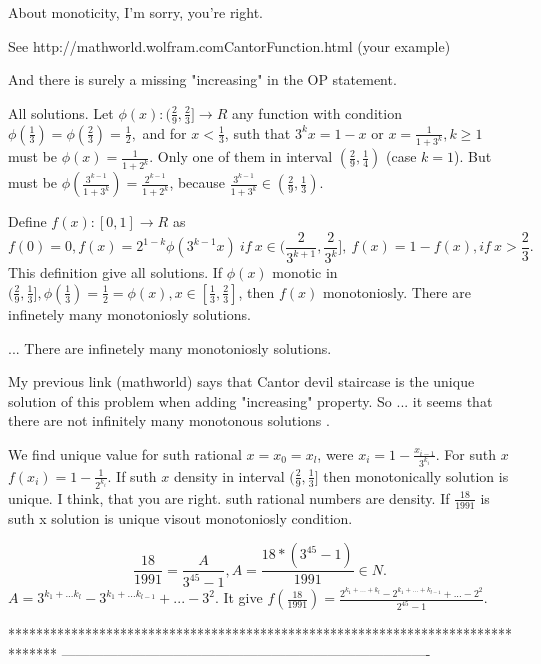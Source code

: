 \begin{solution}
	About monoticity, I'm sorry, you're right. 

See http://mathworld.wolfram.com\/CantorFunction.html (your example)

And there is surely a missing "increasing" in the OP statement.
\end{solution}



\begin{solution}
	All solutions.
Let $\phi(x):(\frac 29,\frac 23]\to R$ any function with condition $\phi(\frac 13)=\phi(\frac 23)=\frac 12,$
and for $x<\frac 13$, suth that $3^kx=1-x$ or $x=\frac{1}{1+3^k}, k\ge 1$ must be $\phi(x)=\frac{1}{1+2^k}$. Only one of them in interval $(\frac 29, \frac 14)$ (case $k=1$). 
But must be $\phi(\frac{3^{k-1}}{1+3^k})=\frac{2^{k-1}}{1+2^k}$, because $\frac{3^{k-1}}{1+3^k}\in(\frac 29, \frac 13).$

Define $f(x):[0,1]\to R$ as \[f(0)=0, f(x)=2^{1-k}\phi(3^{k-1}x) \ if \ x\in (\frac{2}{3^{k+1}},\frac{2}{3^k}], \ f(x)=1-f(x), if \ x>\frac 23.\]
This definition give all solutions.
If $\phi(x)$ monotic in $(\frac 29,\frac 13],  \phi(\frac 13)=\frac 12 =\phi(x), x\in [\frac 13,\frac 23]$, then $f(x)$ monotoniosly.
There are infinetely many monotoniosly solutions.
\end{solution}



\begin{solution}
	\begin{tcolorbox}...
There are infinetely many monotoniosly solutions.\end{tcolorbox}
My previous link (mathworld) says that Cantor devil staircase is the unique solution of this problem when adding "increasing" property. So ... it seems that there are not infinitely many monotonous solutions .
\end{solution}



\begin{solution}
	We find unique value for suth rational $x=x_0=x_l$, were $x_i=1-\frac{x_{i-1}}{3^{k_i}}$.
For suth $x$ $f(x_i)=1-\frac{1}{2^{k_i}}$.
If suth $x$ density in interval $(\frac 29,\frac 13]$ then monotonically solution is unique.
I think, that you are right. suth rational numbers are density.
If $\frac{18}{1991}$ is suth x solution is unique visout monotoniosly condition.

\[\frac{18}{1991}=\frac{A}{3^{45}-1}, A=\frac{18*(3^{45}-1)}{1991}\in N.\]
$A=3^{k_1+...k_l}-3^{k_1+...k_{l-1}}+...-3^2$.
It give $f(\frac{18}{1991})=\frac{2^{k_1+...+k_l}-2^{k_1+...+k_{l-1}}+...-2^2}{2^{45}-1}$.
\end{solution}
*******************************************************************************
-------------------------------------------------------------------------------


